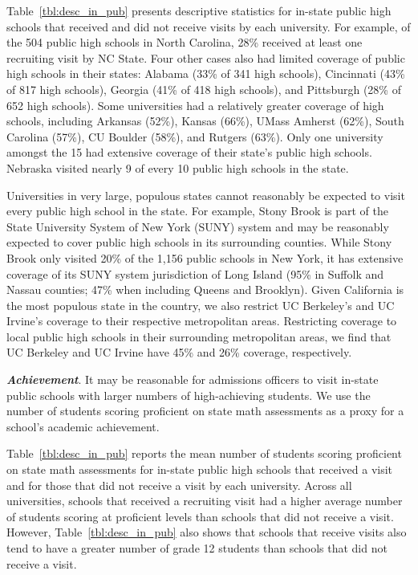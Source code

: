 \documentclass[twoside]{article}
\begin{document}
Table~\ref{tbl:desc_in_pub} presents descriptive statistics for in-state public high schools that received and did not receive visits by each university. For example, of the 504 public high schools in North Carolina, 28\% received at least one recruiting visit by NC State.  Four other cases also had limited coverage of public high schools in their states: Alabama (33\% of 341 high schools), Cincinnati (43\% of 817 high schools), Georgia (41\% of 418 high schools), and Pittsburgh (28\% of 652 high schools). Some universities had a relatively greater coverage of high schools, including Arkansas (52\%), Kansas (66\%), UMass Amherst (62\%), South Carolina (57\%), CU Boulder (58\%), and Rutgers (63\%). Only one university amongst the 15 had extensive coverage of their state's public high schools. Nebraska visited nearly 9 of every 10 public high schools in the state.

Universities in very large, populous states cannot reasonably be expected to visit every public high school in the state. For example, Stony Brook is part of the State University System of New York (SUNY) system and may be reasonably expected to cover public high schools in its surrounding counties. While Stony Brook only visited 20\% of the 1,156 public schools in New York, it has extensive coverage of its SUNY system jurisdiction of Long Island (95\% in Suffolk and Nassau counties; 47\% when including Queens and Brooklyn). Given California is the most populous state in the country, we also restrict UC Berkeley's and UC Irvine's coverage to their respective metropolitan areas. Restricting coverage to local public high schools in their surrounding metropolitan areas, we find that UC Berkeley and UC Irvine have 45\% and 26\% coverage, respectively.

\textbf{\textit{Achievement}}. It may be reasonable for admissions officers to visit in-state public schools with larger numbers of high-achieving students. We use the number of students scoring proficient on state math assessments as a proxy for a school's academic achievement.

Table~\ref{tbl:desc_in_pub} reports the mean number of students scoring proficient on state math assessments for in-state public high schools that received a visit and for those that did not receive a visit by each university. Across all universities, schools that received a recruiting visit had a higher average number of students scoring at proficient levels than schools that did not receive a visit. However, Table~\ref{tbl:desc_in_pub} also shows that schools that receive visits also tend to have a greater number of grade 12 students than schools that did not receive a visit.
\end{document}
